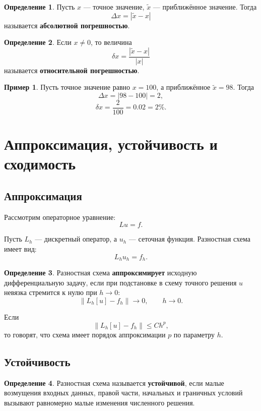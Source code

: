 \documentclass[12pt,a4paper]{article}
\theoremstyle{definition}
\newtheorem{definition}{Определение}
\newtheorem{example}{Пример}
\theoremstyle{plain}
\begin{document}
\begin{definition}
Пусть $x$ --- точное значение, $\widetilde{x}$ --- приближённое значение. Тогда
\[
\Delta x = |\widetilde{x}-x|
\]
называется \textbf{абсолютной погрешностью}.
\end{definition}

\begin{definition}
Если $x\neq 0$, то величина
\[
\delta x = \frac{|\widetilde{x}-x|}{|x|}
\]
называется \textbf{относительной погрешностью}.
\end{definition}

\begin{example}
Пусть точное значение равно $x=100$, а приближённое $\widetilde{x}=98$.
Тогда
\[
\Delta x = |98-100|=2,
\]
\[
\delta x = \frac{2}{100}=0.02=2\%.
\]
\end{example}

\section{Аппроксимация, устойчивость и сходимость}

\subsection{Аппроксимация}

Рассмотрим операторное уравнение:
\[
Lu=f.
\]

Пусть $L_h$ --- дискретный оператор, а $u_h$ --- сеточная функция. Разностная схема имеет вид:
\[
L_h u_h = f_h.
\]

\begin{definition}
Разностная схема \textbf{аппроксимирует} исходную дифференциальную задачу, если при подстановке в схему точного решения $u$ невязка стремится к нулю при $h\to 0$:
\[
\|L_h [u] - f_h\| \to 0,
\qquad h\to 0.
\]
\end{definition}

Если
\[
\|L_h [u] - f_h\| \le C h^p,
\]
то говорят, что схема имеет порядок аппроксимации $p$ по параметру $h$.

\subsection{Устойчивость}

\begin{definition}
Разностная схема называется \textbf{устойчивой}, если малые возмущения входных данных, правой части, начальных и граничных условий вызывают равномерно малые изменения численного решения.
\end{definition}
\end{document}

